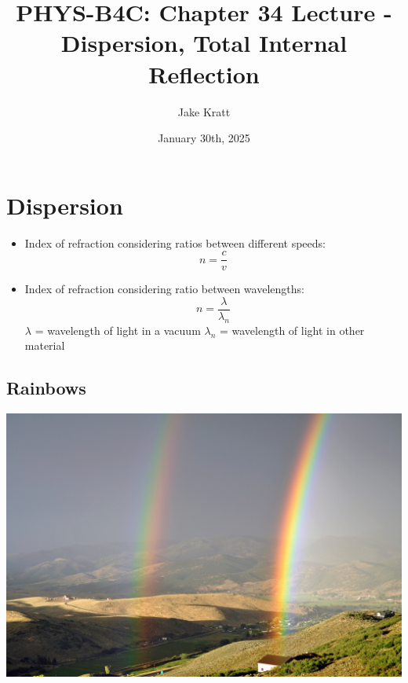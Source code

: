 \documentclass[12pt, letterpaper]{article}
\title{\textbf{PHYS-B4C: Chapter 34 Lecture - Dispersion, Total Internal Reflection}}
\author{Jake Kratt}
\date{January 30th, 2025}
\begin{document}
\maketitle

\section*{Dispersion}

\begin{itemize}
    \item Index of refraction considering ratios between different speeds: \[n = \frac{c}{v}\]
    \item Index of refraction considering ratio between wavelengths: \[n = \frac{\lambda}{\lambda_{n}}\]
    \subitem $\lambda$ = wavelength of light in a vacuum
    \subitem $\lambda_{n}$ = wavelength of light in other material
\end{itemize}

\subsection*{Rainbows}

\begin{center}
    \includegraphics{images/doublerainbow.jpg}
\end{center}
\end{document}
